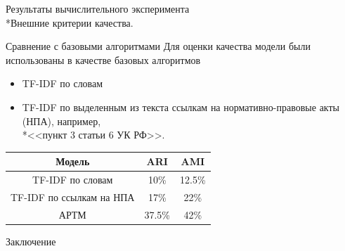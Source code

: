 \documentclass{beamer}
\begin{document}
\begin{frame}{Результаты вычислительного эксперимента \\*Внешние критерии качества.}
\begin{block}{Сравнение с базовыми алгоритмами}
	Для оценки качества модели были использованы в качестве базовых алгоритмов  
    \begin{itemize}
        \item TF-IDF по словам 
        \item TF-IDF по выделенным из текста ссылкам на нормативно-правовые акты (НПА), например, \\*<<пункт 3 статьи 6 УК РФ>>.
    \end{itemize} 
    \end{block}

\begin{table}[H]
\begin{center}
\begin{tabular}{|c|c|c|}
\hline
Модель & ARI & AMI\\
\hline
TF-IDF по словам & 10\% & 12.5\% \\
\hline
TF-IDF по ссылкам на НПА & 17\% & 22\% \\
\hline
АРТМ & 37.5\% & 42\% \\
\hline
\end{tabular}
\end{center}
\end{table}
\end{frame}
\begin{frame}{Заключение}
\end{frame}
\end{document}
